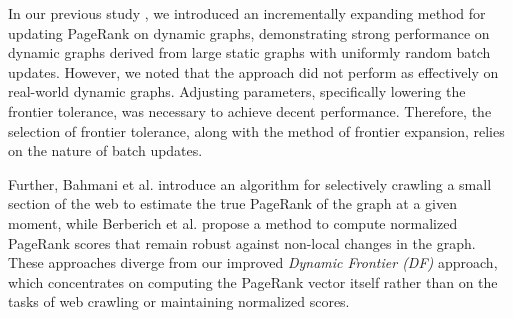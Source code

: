 In our previous study \cite{sahu2024incrementally}, we introduced an incrementally expanding method for updating PageRank on dynamic graphs, demonstrating strong performance on dynamic graphs derived from large static graphs with uniformly random batch updates. However, we noted that the approach did not perform as effectively on real-world dynamic graphs. Adjusting parameters, specifically lowering the frontier tolerance, was necessary to achieve decent performance. Therefore, the selection of frontier tolerance, along with the method of frontier expansion, relies on the nature of batch updates.

Further, Bahmani et al. \cite{rank-bahmani12} introduce an algorithm for selectively crawling a small section of the web to estimate the true PageRank of the graph at a given moment, while Berberich et al. \cite{rank-berberich07} propose a method to compute normalized PageRank scores that remain robust against non-local changes in the graph. These approaches diverge from our improved \textit{Dynamic Frontier (DF)} approach, which concentrates on computing the PageRank vector itself rather than on the tasks of web crawling or maintaining normalized scores.





